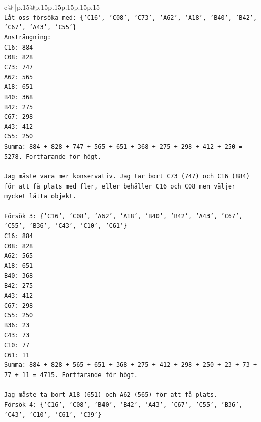 \documentclass{article}
\begin{document}
{\begin{supertabular}{c@{$\;$}|p{.15\linewidth}@{}p{.15\linewidth}p{.15\linewidth}p{.15\linewidth}p{.15\linewidth}p{.15\linewidth}}
{{{\\ 
\texttt{Låt oss försöka med: \{'C16', 'C08', 'C73', 'A62', 'A18', 'B40', 'B42', 'C67', 'A43', 'C55'\}} \\
\texttt{Ansträngning:} \\
\texttt{C16: 884} \\
\texttt{C08: 828} \\
\texttt{C73: 747} \\
\texttt{A62: 565} \\
\texttt{A18: 651} \\
\texttt{B40: 368} \\
\texttt{B42: 275} \\
\texttt{C67: 298} \\
\texttt{A43: 412} \\
\texttt{C55: 250} \\
\texttt{Summa: 884 + 828 + 747 + 565 + 651 + 368 + 275 + 298 + 412 + 250 = 5278. Fortfarande för högt.} \\
\\ 
\texttt{Jag måste vara mer konservativ. Jag tar bort C73 (747) och C16 (884) för att få plats med fler, eller behåller C16 och C08 men väljer mycket lätta objekt.} \\
\\ 
\texttt{Försök 3: \{'C16', 'C08', 'A62', 'A18', 'B40', 'B42', 'A43', 'C67', 'C55', 'B36', 'C43', 'C10', 'C61'\}} \\
\texttt{C16: 884} \\
\texttt{C08: 828} \\
\texttt{A62: 565} \\
\texttt{A18: 651} \\
\texttt{B40: 368} \\
\texttt{B42: 275} \\
\texttt{A43: 412} \\
\texttt{C67: 298} \\
\texttt{C55: 250} \\
\texttt{B36: 23} \\
\texttt{C43: 73} \\
\texttt{C10: 77} \\
\texttt{C61: 11} \\
\texttt{Summa: 884 + 828 + 565 + 651 + 368 + 275 + 412 + 298 + 250 + 23 + 73 + 77 + 11 = 4715. Fortfarande för högt.} \\
\\ 
\texttt{Jag måste ta bort A18 (651) och A62 (565) för att få plats.} \\
\texttt{Försök 4: \{'C16', 'C08', 'B40', 'B42', 'A43', 'C67', 'C55', 'B36', 'C43', 'C10', 'C61', 'C39'\}} \\
}}}
\end{supertabular}}
\end{document}
